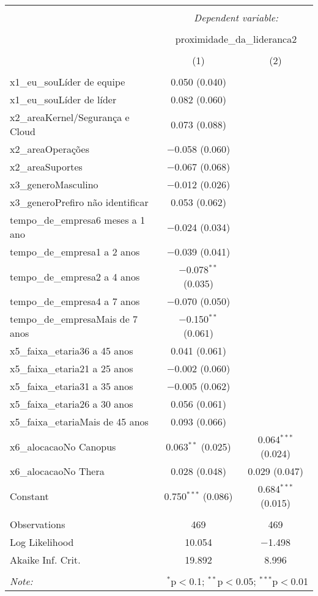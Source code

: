 \documentclass[]{book}
\begin{document}
\begin{table}[!htbp] \centering 
  \caption{} 
  \label{} 
\begin{tabular}{@{\extracolsep{5pt}}lcc} 
\\[-1.8ex]\hline 
\hline \\[-1.8ex] 
 & \multicolumn{2}{c}{\textit{Dependent variable:}} \\ 
\cline{2-3} 
\\[-1.8ex] & \multicolumn{2}{c}{proximidade\_da\_lideranca2} \\ 
\\[-1.8ex] & (1) & (2)\\ 
\hline \\[-1.8ex] 
 x1\_eu\_souLíder de equipe & 0.050 (0.040) &  \\ 
  x1\_eu\_souLíder de líder & 0.082 (0.060) &  \\ 
  x2\_areaKernel/Segurança e Cloud & 0.073 (0.088) &  \\ 
  x2\_areaOperações & $-$0.058 (0.060) &  \\ 
  x2\_areaSuportes & $-$0.067 (0.068) &  \\ 
  x3\_generoMasculino & $-$0.012 (0.026) &  \\ 
  x3\_generoPrefiro não identificar & 0.053 (0.062) &  \\ 
  tempo\_de\_empresa6 meses a 1 ano & $-$0.024 (0.034) &  \\ 
  tempo\_de\_empresa1 a 2 anos & $-$0.039 (0.041) &  \\ 
  tempo\_de\_empresa2 a 4 anos & $-$0.078$^{**}$ (0.035) &  \\ 
  tempo\_de\_empresa4 a 7 anos & $-$0.070 (0.050) &  \\ 
  tempo\_de\_empresaMais de 7 anos & $-$0.150$^{**}$ (0.061) &  \\ 
  x5\_faixa\_etaria36 a 45 anos & 0.041 (0.061) &  \\ 
  x5\_faixa\_etaria21 a 25 anos & $-$0.002 (0.060) &  \\ 
  x5\_faixa\_etaria31 a 35 anos & $-$0.005 (0.062) &  \\ 
  x5\_faixa\_etaria26 a 30 anos & 0.056 (0.061) &  \\ 
  x5\_faixa\_etariaMais de 45 anos & 0.093 (0.066) &  \\ 
  x6\_alocacaoNo Canopus & 0.063$^{**}$ (0.025) & 0.064$^{***}$ (0.024) \\ 
  x6\_alocacaoNo Thera & 0.028 (0.048) & 0.029 (0.047) \\ 
  Constant & 0.750$^{***}$ (0.086) & 0.684$^{***}$ (0.015) \\ 
 \hline \\[-1.8ex] 
Observations & 469 & 469 \\ 
Log Likelihood & 10.054 & $-$1.498 \\ 
Akaike Inf. Crit. & 19.892 & 8.996 \\ 
\hline 
\hline \\[-1.8ex] 
\textit{Note:}  & \multicolumn{2}{r}{$^{*}$p$<$0.1; $^{**}$p$<$0.05; $^{***}$p$<$0.01} \\ 
\end{tabular} 
\end{table}
\end{document}

